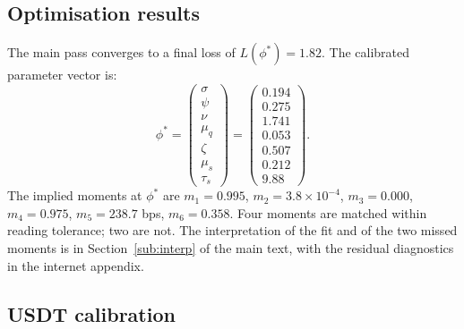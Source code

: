 \subsection{Optimisation results}\label{sub:opt_results}

The main pass converges to a final loss of $L(\phi^*) = 1.82$. The calibrated parameter vector is:
\begin{equation}\label{eq:phi_star}
\phi^* = \begin{pmatrix}
\sigma \\ \psi \\ \nu \\ \mu_q \\ \zeta \\ \mu_s \\ \tau_s
\end{pmatrix} = \begin{pmatrix}
0.194 \\ 0.275 \\ 1.741 \\ 0.053 \\ 0.507 \\ 0.212 \\ 9.88
\end{pmatrix}.
\end{equation}
The implied moments at $\phi^*$ are $m_1 = 0.995$, $m_2 = 3.8 \times 10^{-4}$, $m_3 = 0.000$, $m_4 = 0.975$, $m_5 = 238.7$ bps, $m_6 = 0.358$. Four moments are matched within reading tolerance; two are not. The interpretation of the fit and of the two missed moments is in Section~\ref{sub:interp} of the main text, with the residual diagnostics in the internet appendix.

\subsection{USDT calibration}\label{sub:usdt_calibration}

